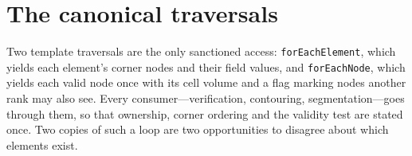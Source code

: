 \section{The canonical traversals}

Two template traversals are the only sanctioned access:
\texttt{forEachElement}, which yields each element's corner nodes and their
field values, and \texttt{forEachNode}, which yields each valid node once with
its cell volume and a flag marking nodes another rank may also see. Every
consumer---verification, contouring, segmentation---goes through them, so that
ownership, corner ordering and the validity test are stated once. Two copies of
such a loop are two opportunities to disagree about which elements exist.
